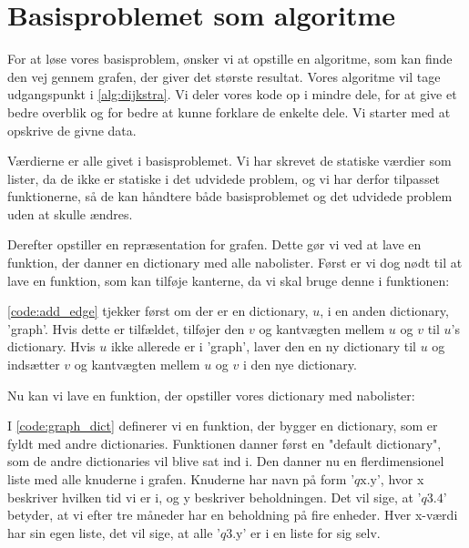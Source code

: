 \section{Basisproblemet som algoritme}
For at løse vores basisproblem, ønsker vi at opstille en algoritme, som kan finde den vej gennem grafen, der giver det største resultat. Vores algoritme vil tage udgangspunkt i \autoref{alg:dijkstra}. Vi deler vores kode op i mindre dele, for at give et bedre overblik og for bedre at kunne forklare de enkelte dele. Vi starter med at opskrive de givne data. 



Værdierne er alle givet i basisproblemet. Vi har skrevet de statiske værdier som lister, da de ikke er statiske i det udvidede problem, og vi har derfor tilpasset funktionerne, så de kan håndtere både basisproblemet og det udvidede problem uden at skulle ændres. 

Derefter opstiller en repræsentation for grafen. Dette gør vi ved at lave en funktion, der danner en dictionary med alle nabolister. Først er vi dog nødt til at lave en funktion, som kan tilføje kanterne, da vi skal bruge denne i funktionen:



\autoref{code:add_edge} tjekker først om der er en dictionary, $u$, i en anden dictionary, 'graph'. Hvis dette er tilfældet, tilføjer den $v$ og kantvægten mellem $u$ og $v$ til  $u$'s dictionary. Hvis $u$ ikke allerede er i 'graph', laver den en ny dictionary til $u$ og indsætter $v$ og kantvægten mellem $u$ og $v$ i den nye dictionary.

Nu kan vi lave en funktion, der opstiller vores dictionary med nabolister:



I \autoref{code:graph_dict} definerer vi en funktion, der bygger en dictionary, som er fyldt med andre dictionaries. Funktionen danner først en "default dictionary", som de andre dictionaries vil blive sat ind i.
Den danner nu en flerdimensionel liste med alle knuderne i grafen. Knuderne har navn på form '$q\textrm{x.y}$', hvor x beskriver hvilken tid vi er i, og y beskriver beholdningen. Det vil sige, at '$q3.4$' betyder, at vi efter tre måneder har en beholdning på fire enheder. Hver x-værdi har sin egen liste, det vil sige, at alle '$q\textrm{3.y}$' er i en liste for sig selv.

